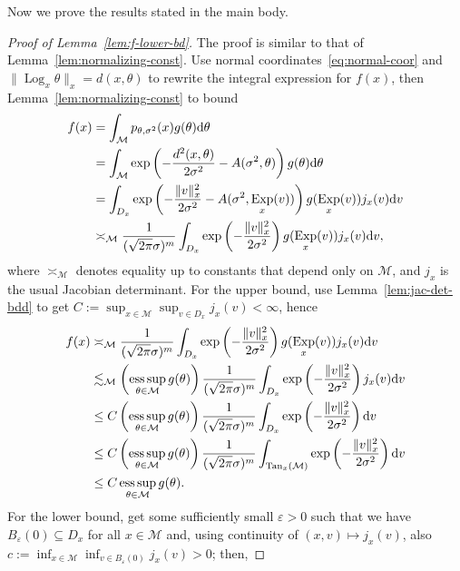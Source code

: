 \documentclass[preprint]{imsart}
\theoremstyle{plain}
\theoremstyle{definition}
\newcommand{\Mcal}{\mathcal{M}}
\newcommand{\diff}{\textnormal{d}}
\DeclareMathOperator{\Tan}{Tan}
\DeclareMathOperator{\Log}{Log}
\DeclareMathOperator{\Exp}{Exp}
\begin{document}
\begin{appendix}
Now we prove the results stated in the main body.

\begin{proof}[Proof of Lemma~\ref{lem:f-lower-bd}]
    The proof is similar to that of Lemma~\ref{lem:normalizing-const}.
    Use normal coordinates~\eqref{eq:normal-coor} and $\|\Log_x\theta\|_x =d(x,\theta)$ to rewrite the integral expression for $f(x)$, then Lemma~\ref{lem:normalizing-const} to bound
    \begin{align*}
        f(x) &= \int_{\Mcal}p_{\theta,\sigma^2}(x)g(\theta)\diff \theta \\
        &=\int_{\Mcal}\exp\left(-\frac{d^2(x,\theta)}{2\sigma^2}-A(\sigma^2,\theta)\right)g(\theta)\diff \theta \\
        & = \int_{D_x}\exp\left(-\frac{\|v\|_x^2}{2\sigma^2}-A(\sigma^2,\Exp_x(v))\right)g(\Exp_x(v))j_x(v)\diff v \\
        & \asymp_{\Mcal} \frac{1}{(\sqrt{2\pi}\sigma)^m}\int_{D_x}\exp\left(-\frac{\|v\|_x^2}{2\sigma^2}\right)g(\Exp_x(v))j_x(v)\diff v,
    \end{align*}
    where $\asymp_{\Mcal}$ denotes equality up to constants that depend only on $\Mcal$, and $j_x$ is the usual Jacobian determinant.
    For the upper bound, use Lemma~\ref{lem:jac-det-bdd} to get $C:=\sup_{x\in\Mcal}\sup_{v\in D_x} j_x(v)<\infty$, hence
    \begin{align*}
        f(x) &\asymp_{\Mcal} \frac{1}{(\sqrt{2\pi}\sigma)^m}\int_{D_x}\exp\left(-\frac{\|v\|_x^2}{2\sigma^2}\right)g(\Exp_x(v))j_x(v)\diff v \\
        &\lesssim_{\Mcal} \left(\underset{\theta\in\Mcal}{\textnormal{ess}\sup}\,g(\theta)\right)\frac{1}{(\sqrt{2\pi}\sigma)^m}\int_{D_x}\exp\left(-\frac{\|v\|_x^2}{2\sigma^2}\right)j_x(v)\diff v \\
        &\le C\left(\underset{\theta\in\Mcal}{\textnormal{ess}\sup}\,g(\theta)\right)\frac{1}{(\sqrt{2\pi}\sigma)^m}\int_{D_x}\exp\left(-\frac{\|v\|_x^2}{2\sigma^2}\right)\diff v \\
        &\le C\left(\underset{\theta\in\Mcal}{\textnormal{ess}\sup}\,g(\theta)\right)\frac{1}{(\sqrt{2\pi}\sigma)^m}\int_{\Tan_x(\Mcal)}\exp\left(-\frac{\|v\|_x^2}{2\sigma^2}\right)\diff v \\
        &\le C\,\underset{\theta\in\Mcal}{\textnormal{ess}\sup}\,g(\theta).
    \end{align*}
    For the lower bound, get some sufficiently small $\varepsilon>0$ such that we have $B_{\varepsilon}(0)\subseteq D_x$ for all $x\in\Mcal$ and, using continuity of $(x,v)\mapsto j_x(v)$,  also $c:=\inf_{x\in\Mcal}\inf_{v\in B_{\varepsilon}(0)}j_x(v)>0$; then,

\end{proof}
\end{appendix}
\end{document}
